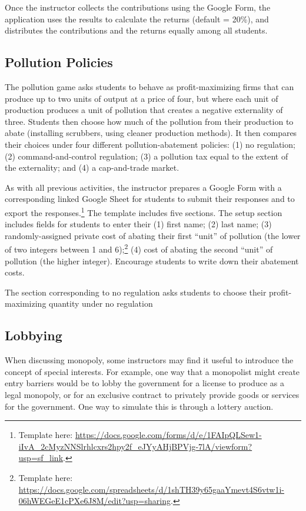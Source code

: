 \documentclass[
]{article}
\begin{document}
Once the instructor collects the contributions using the Google Form,
the application uses the results to calculate the returns (default =
20\%), and distributes the contributions and the returns equally among
all students.

\hypertarget{pollution-policies}{%
\subsection{Pollution Policies}\label{pollution-policies}}

The pollution game asks students to behave as profit-maximizing firms
that can produce up to two units of output at a price of four, but where
each unit of production produces a unit of pollution that creates a
negative externality of three. Students then choose how much of the
pollution from their production to abate (installing scrubbers, using
cleaner production methods). It then compares their choices under four
different pollution-abatement policies: (1) no regulation; (2)
command-and-control regulation; (3) a pollution tax equal to the extent
of the externality; and (4) a cap-and-trade market.

As with all previous activities, the instructor prepares a Google Form
with a corresponding linked Google Sheet for students to submit their
responses and to export the responses.\footnote{Template here:
  \url{https://docs.google.com/forms/d/e/1FAIpQLSew1-iIvA_2cMyzNNSlrhlcxrs2hpy2f_eJYyAHjBPVjg-7lA/viewform?usp=sf_link}.}
The template includes five sections. The setup section includes fields
for students to enter their (1) first name; (2) last name; (3)
randomly-assigned private cost of abating their first ``unit'' of
pollution (the lower of two integers between 1 and 6);\footnote{Template
  here:
  \url{https://docs.google.com/spreadsheets/d/1shTH39y65gaaYmevt4S6vtw1i-06hWEGeE1cPXe6J8M/edit?usp=sharing}.}
(4) cost of abating the second ``unit'' of pollution (the higher
integer). Encourage students to write down their abatement costs.

The section corresponding to no regulation asks students to choose their
profit-maximizing quantity under no regulation

\hypertarget{lobbying}{%
\subsection{Lobbying}\label{lobbying}}

When discussing monopoly, some instructors may find it useful to
introduce the concept of special interests. For example, one way that a
monopolist might create entry barriers would be to lobby the government
for a license to produce as a legal monopoly, or for an exclusive
contract to privately provide goods or services for the government. One
way to simulate this is through a lottery auction.
\end{document}
